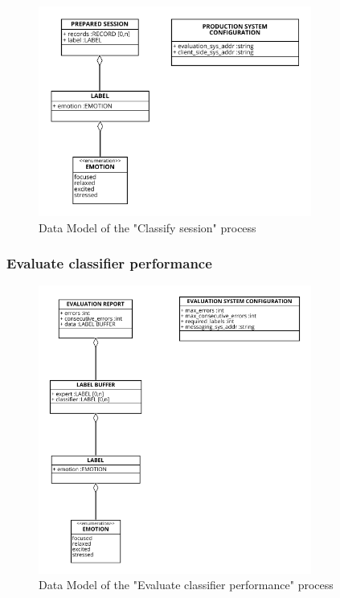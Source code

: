 \begin{figure}[H]
\centering
\includegraphics[width=0.8\textwidth]{figures/Data Model - Classify Session.png}
\caption{Data Model of the "Classify session" process}
\label{fig:data_classify_session}
\end{figure}

\subsubsection{Evaluate classifier performance}
\label{sec:data_evaluate_classifier_performance}

\begin{figure}[H]
\centering
\includegraphics[width=0.8\textwidth]{figures/Data Model - Evaluate Classifier Performance.png}
\caption{Data Model of the "Evaluate classifier performance" process}
\label{fig:data_evaluate_classifier_performance}
\end{figure}
